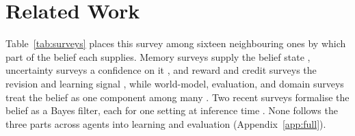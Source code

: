 \section{Related Work}
\label{sec:related}

\ifnature\else
Table~\ref{tab:surveys} places this survey among sixteen neighbouring ones by which part of the belief each supplies. Memory surveys supply the belief state \citep{zhang2024memory,hu2025memory,luo2026storage}, uncertainty surveys a confidence on it \citep{xia2025uncertainty,lin2026uncertainty}, and reward and credit surveys the revision and learning signal \citep{wu2025rewards,zheng2025prm,zhang2025landscape,zhang2026reasoning}, while world-model, evaluation, and domain surveys treat the belief as one component among many \citep{li2026bridging,chen2026horizon,yehudai2025survey,gao2025survey,xu2026llm,dong2025finance}. Two recent surveys formalise the belief as a Bayes filter, each for one setting at inference time \citep{cai2026complex,tang2026proactive}. None follows the three parts across agents into learning and evaluation (Appendix~\ref{app:full}).
\fi
